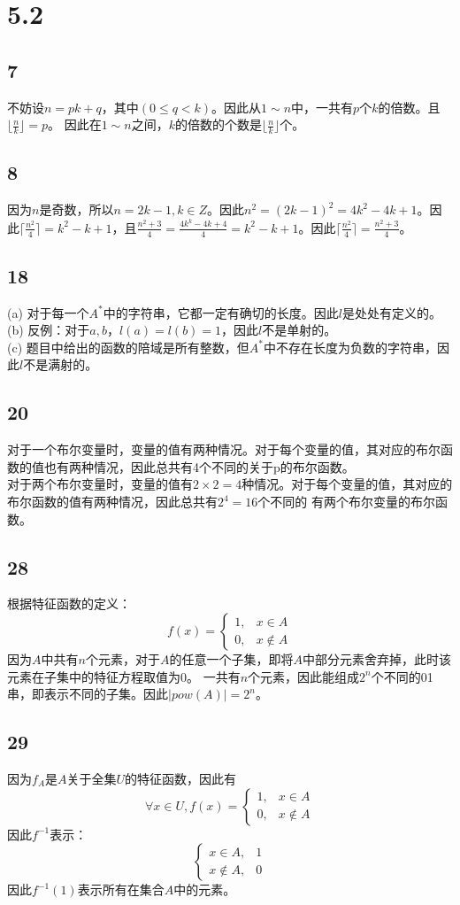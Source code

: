 \documentclass{article}
\begin{document}
\section{5.2}
\subsection{7}
不妨设$n = pk + q$，其中$(0 \leq q < k)$。因此从$1 \sim n$中，一共有$p$个$k$的倍数。且$\lfloor \frac{n}{k} \rfloor = p$。
因此在$1 \sim n$之间，$k$的倍数的个数是$\lfloor \frac{n}{k} \rfloor$个。
\subsection{8}
因为$n$是奇数，所以$n = 2k - 1, k \in Z$。因此$n^2 =  (2k - 1)^2 = 4k^2 - 4k + 1$。因此$\lceil \frac{n^2}{4} \rceil = 
k^2 - k + 1$，且$\frac{n^2 + 3}{4} = \frac{4k^k - 4k + 4}{4} = k^2 - k + 1$。因此$\lceil \frac{n^2}{4} \rceil = \frac{n^2 + 3}{4}$。
\subsection{18}
(a) 对于每一个$A^*$中的字符串，它都一定有确切的长度。因此$l$是处处有定义的。\\
(b) 反例：对于$a, b$，$l(a) = l(b) = 1$，因此$l$不是单射的。\\
(c) 题目中给出的函数的陪域是所有整数，但$A^*$中不存在长度为负数的字符串，因此$l$不是满射的。
\subsection{20}
对于一个布尔变量时，变量的值有两种情况。对于每个变量的值，其对应的布尔函数的值也有两种情况，因此总共有4个不同的关于p的布尔函数。\\
对于两个布尔变量时，变量的值有$2 \times 2 = 4$种情况。对于每个变量的值，其对应的布尔函数的值有两种情况，因此总共有$2^4 = 16$个不同的
有两个布尔变量的布尔函数。
\subsection{28}
根据特征函数的定义：$$
f(x) = 
\begin{cases}
    1, & x \in A\\
    0, & x \notin A
\end{cases}
$$
因为$A$中共有$n$个元素，对于$A$的任意一个子集，即将$A$中部分元素舍弃掉，此时该元素在子集中的特征方程取值为0。
一共有$n$个元素，因此能组成$2^n$个不同的01串，即表示不同的子集。因此$|pow(A)| = 2^n$。
\subsection{29}
因为$f_A$是$A$关于全集$U$的特征函数，因此有$$
\forall x \in U, f(x) = 
\begin{cases}
    1, & x \in A\\
    0, & x \notin A
\end{cases}
$$
因此$f^{-1}$表示：$$
\begin{cases}
    x \in A, & 1\\
    x \notin A, & 0
\end{cases}
$$
因此$f^{-1}(1)$表示所有在集合$A$中的元素。
\end{document}
